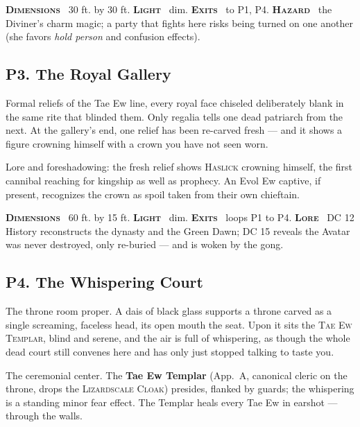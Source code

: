 \documentclass[10pt,twoside]{article}
\newcommand{\tech}[1]{\textbf{\scshape\textcolor{stone}{#1}}\ }
\newcommand{\eqname}[1]{\textsc{#1}}
\begin{document}
\begin{techbox}
\tech{Dimensions} 30 ft. by 30 ft. \tech{Light} dim. \tech{Exits} to P1, P4.
\tech{Hazard} the Diviner's charm magic; a party that fights here risks being turned
on one another (she favors \textit{hold person} and confusion effects).
\end{techbox}

\subsection{P3. The Royal Gallery}
\begin{readaloud}
Formal reliefs of the Tae Ew line, every royal face chiseled deliberately blank in
the same rite that blinded them. Only regalia tells one dead patriarch from the
next. At the gallery's end, one relief has been re-carved fresh --- and it shows a
figure crowning himself with a crown you have not seen worn.
\end{readaloud}
Lore and foreshadowing: the fresh relief shows \eqname{Haslick} crowning himself, the
first cannibal reaching for kingship as well as prophecy. An Evol Ew captive, if
present, recognizes the crown as spoil taken from their own chieftain.

\begin{techbox}
\tech{Dimensions} 60 ft. by 15 ft. \tech{Light} dim. \tech{Exits} loops P1 to P4.
\tech{Lore} DC 12 History reconstructs the dynasty and the Green Dawn; DC 15 reveals
the Avatar was never destroyed, only re-buried --- and is woken by the gong.
\end{techbox}

\subsection{P4. The Whispering Court}
\begin{readaloud}
The throne room proper. A dais of black glass supports a throne carved as a single
screaming, faceless head, its open mouth the seat. Upon it sits the
\eqname{Tae Ew Templar}, blind and serene, and the air is full of whispering, as
though the whole dead court still convenes here and has only just stopped talking to
taste you.
\end{readaloud}
The ceremonial center. The \textbf{Tae Ew Templar} (App.\ A, canonical cleric on the
throne, drops the \eqname{Lizardscale Cloak}) presides, flanked by guards; the
whispering is a standing minor fear effect. The Templar heals every Tae Ew in
earshot --- through the walls.
\end{document}
